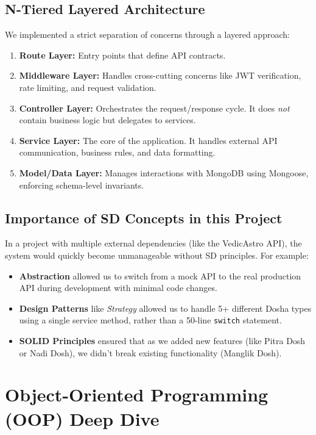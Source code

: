 \documentclass[12pt,a4paper]{article}
\begin{document}
\subsection{N-Tiered Layered Architecture}
We implemented a strict separation of concerns through a layered approach:
\begin{enumerate}
    \item \textbf{Route Layer:} Entry points that define API contracts.
    \item \textbf{Middleware Layer:} Handles cross-cutting concerns like JWT verification, rate limiting, and request validation.
    \item \textbf{Controller Layer:} Orchestrates the request/response cycle. It does \textit{not} contain business logic but delegates to services.
    \item \textbf{Service Layer:} The core of the application. It handles external API communication, business rules, and data formatting.
    \item \textbf{Model/Data Layer:} Manages interactions with MongoDB using Mongoose, enforcing schema-level invariants.
\end{enumerate}

\subsection{Importance of SD Concepts in this Project}
In a project with multiple external dependencies (like the VedicAstro API), the system would quickly become unmanageable without SD principles. For example:
\begin{itemize}
    \item \textbf{Abstraction} allowed us to switch from a mock API to the real production API during development with minimal code changes.
    \item \textbf{Design Patterns} like \textit{Strategy} allowed us to handle 5+ different Dosha types using a single service method, rather than a 50-line \texttt{switch} statement.
    \item \textbf{SOLID Principles} ensured that as we added new features (like Pitra Dosh or Nadi Dosh), we didn't break existing functionality (Manglik Dosh).
\end{itemize}

\section{Object-Oriented Programming (OOP) Deep Dive}
\end{document}
